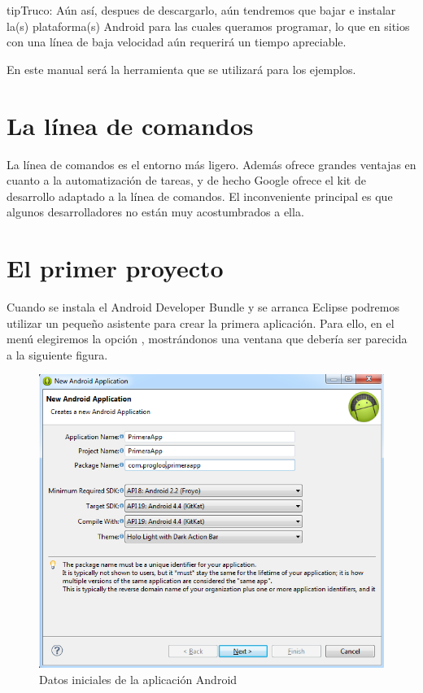 \documentclass[a4paper,12pt,spanish]{sphinxmanual}
\begin{document}
\begin{notice}{tip}{Truco:}
Aún así, despues de descargarlo, aún tendremos que bajar e instalar la(s) plataforma(s) Android para las cuales queramos programar, lo que en sitios con una línea de baja velocidad aún requerirá un tiempo apreciable.
\end{notice}

En este manual será la herramienta que se utilizará para los ejemplos.


\section{La línea de comandos}
\label{tema1:la-linea-de-comandos}
La línea de comandos es el entorno más ligero. Además ofrece grandes ventajas en cuanto a la automatización de tareas, y de hecho Google ofrece el kit de desarrollo adaptado a la línea de comandos. El inconveniente principal es que algunos desarrolladores no están muy acostumbrados a ella.


\section{El primer proyecto}
\label{tema1:el-primer-proyecto}
Cuando se instala el Android Developer Bundle y se arranca Eclipse podremos utilizar un pequeño asistente para crear la primera aplicación. Para ello, en el menú  elegiremos la opción , mostrándonos una ventana que debería ser parecida a la siguiente figura.
\begin{figure}[htbp]
\centering
\capstart

\includegraphics{asistente1.png}
\caption{Datos iniciales de la aplicación Android}\end{figure}
\end{document}
